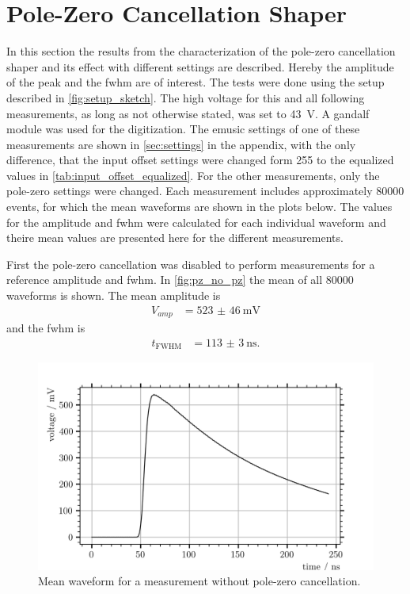 \section{Pole-Zero Cancellation Shaper}

In this section the results from the characterization of the pole-zero cancellation shaper and its effect with different settings are described.
Hereby the amplitude of the peak and the \ac{fwhm} are of interest.
The tests were done using the setup described in \autoref{fig:setup_sketch}.
The high voltage for this and all following measurements, as long as not otherwise stated, was set to \SI{43}{\volt}. 
A \ac{gandalf} module was used for the digitization.
The \ac{emusic} settings of one of these measurements are shown in \autoref{sec:settings} in the appendix, with the only difference, that the input offset settings were changed form \SI{255}{\dacu} to the equalized values in \autoref{tab:input_offset_equalized}.
For the other measurements, only the pole-zero settings were changed.
Each measurement includes approximately \num{80000} events, for which the mean waveforms are shown in the plots below.
The values for the amplitude and \ac{fwhm} were calculated for each individual waveform and theire mean values are presented here for the different measurements.

First the pole-zero cancellation was disabled to perform measurements for a reference amplitude and \ac{fwhm}.
In \autoref{fig:pz_no_pz} the mean of all \num{80000} waveforms is shown.
The mean amplitude is 
\begin{align}
    V_{amp} &= \SI{523(46)}{\milli\volt}
\end{align}
and the \ac{fwhm} is
\begin{align}
    t_\text{FWHM} &= \SI{113(3)}{\nano\second}.
\end{align}
\begin{figure}
	\centering
	\includegraphics[width=1.\textwidth]{pictures/pz_no_pz}
	\caption[Mean waveform for a measurement without pole-zero cancellation.]{Mean waveform for a measurement without pole-zero cancellation.}
	\label{fig:pz_no_pz}
\end{figure}

